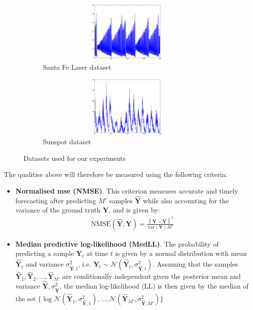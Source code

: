 \documentclass[pdftex,10pt,a4paper,journal]{article}
\theoremstyle{definition}
\theoremstyle{remark}
\newcommand*{\V}[1]{\mathbf{#1}}%
\newcommand{\norm}[1]{\left\lVert#1\right\rVert}
\begin{document}
\begin{multicols}{2}
\begin{figure}[ht]
    \begin{subfigure}[t]{0.5\textwidth}
        \centering
        \includegraphics[height=1.2in, width=3.8in]{figs/laser.png}
        \caption{Santa Fe Laser dataset}
    \end{subfigure}
    
    \begin{subfigure}[t]{0.5\textwidth}
        \centering
        \includegraphics[height=1.2in, width=3.8in]{figs/sunspot.png}
        \caption{Sunspot dataset}
    \end{subfigure}
    \caption{Datasets used for our experiments}\label{fig:datasets}
\end{figure}

The qualities above will therefore be measured using the following criteria:
\begin{itemize}
    \item \textbf{Normalised \acrlong*{mse} (NMSE)}. This criterion measures accurate and timely forecasting after predicting $M'$ samples $\V{\hat{Y}}$ while also accounting for the variance of the ground truth $\V{Y}$, and is given by:
    \begin{align*}
        \text{NMSE}(\hat{\V{Y}}, \V{Y}) = \frac{\norm{\V{Y} - \V{\hat{Y}}}^2}{\text{var}{(\V{Y})}M'}
    \end{align*}
    
    \item \textbf{Median predictive log-likelihood (MedLL)}. The probability of predicting a sample $\V{Y}_t$ at time $t$ is given by a normal distribution with mean $\V{\hat{Y}}_t$ and variance $\sigma^2_{\V{\hat{Y}}, t}$, i.e. $\V{Y}_t \sim \mathcal{N}(\V{\hat{Y}}_t, \sigma^2_{\V{\hat{Y}}, t})$. Assuming that the samples $\V{\hat{Y}}_1, \V{\hat{Y}}_2, ..., \V{\hat{Y}}_{M'}$ are conditionally independent given the posterior mean and variance $\V{\hat{Y}}, \sigma^2_{\V{\hat{Y}}}$, the median log-likelihood (LL) is then given by the median of the set $\{\log{\mathcal{N}(\V{\hat{Y}}_1, \sigma^2_{\V{\hat{Y}}, 1})}, ..., 
    \mathcal{N}(\V{\hat{Y}}_{M'}, \sigma^2_{\V{\hat{Y}}, M'})\}$
    

\end{itemize}
\end{multicols}
\end{document}
